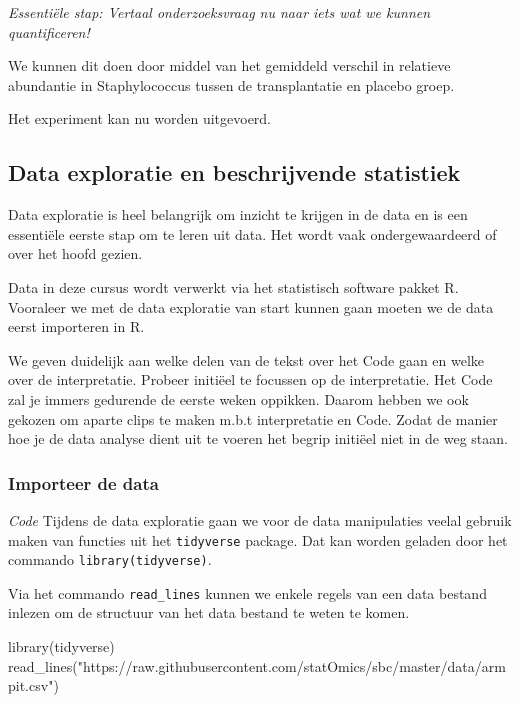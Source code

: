 \documentclass[
  dutch,
  letterpaper,
  12pt]{book}
\newenvironment{Shaded}{\begin{snugshade}}{\end{snugshade}}
\newcommand{\FunctionTok}[1]{\textcolor[rgb]{0.28,0.35,0.67}{#1}}
\newcommand{\NormalTok}[1]{\textcolor[rgb]{0.00,0.23,0.31}{#1}}
\newcommand{\StringTok}[1]{\textcolor[rgb]{0.13,0.47,0.30}{#1}}
\theoremstyle{definition}
\theoremstyle{definition}
\theoremstyle{definition}
\theoremstyle{remark}
\begin{document}
\emph{Essentiële stap: Vertaal onderzoeksvraag nu naar iets wat we
kunnen quantificeren!}

We kunnen dit doen door middel van het gemiddeld verschil in relatieve
abundantie in Staphylococcus tussen de transplantatie en placebo groep.

Het experiment kan nu worden uitgevoerd.

\subsection{Data exploratie en beschrijvende
statistiek}\label{data-exploratie-en-beschrijvende-statistiek}

Data exploratie is heel belangrijk om inzicht te krijgen in de data en
is een essentiële eerste stap om te leren uit data. Het wordt vaak
ondergewaardeerd of over het hoofd gezien.

Data in deze cursus wordt verwerkt via het statistisch software pakket
R. Vooraleer we met de data exploratie van start kunnen gaan moeten we
de data eerst importeren in R.

We geven duidelijk aan welke delen van de tekst over het Code gaan en
welke over de interpretatie. Probeer initiëel te focussen op de
interpretatie. Het Code zal je immers gedurende de eerste weken
oppikken. Daarom hebben we ook gekozen om aparte clips te maken m.b.t
interpretatie en Code. Zodat de manier hoe je de data analyse dient uit
te voeren het begrip initiëel niet in de weg staan.

\subsubsection{Importeer de data}\label{importeer-de-data}

\emph{Code} Tijdens de data exploratie gaan we voor de data manipulaties
veelal gebruik maken van functies uit het \texttt{tidyverse} package.
Dat kan worden geladen door het commando \texttt{library(tidyverse)}.

Via het commando \texttt{read\_lines} kunnen we enkele regels van een
data bestand inlezen om de structuur van het data bestand te weten te
komen.

\begin{Shaded}
\begin{Highlighting}[]
\FunctionTok{library}\NormalTok{(tidyverse)}
\FunctionTok{read\_lines}\NormalTok{(}\StringTok{"https://raw.githubusercontent.com/statOmics/sbc/master/data/armpit.csv"}\NormalTok{)}
\end{Highlighting}
\end{Shaded}
\end{document}
